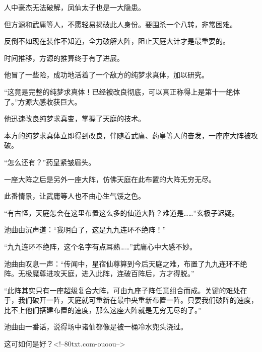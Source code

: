 \begin{this_body}
人中豪杰无法破解，凤仙太子也是一大隐患。

但方源和武庸等人，不愿轻易揭破此人身份。要围杀一个八转，非常困难。

反倒不如现在装作不知道，全力破解大阵，阻止天庭大计才是最重要的。

时间推移，方源的推算终于有了进展。

他冒了一些险，成功地活着了一个敌方的纯梦求真体，加以研究。

“这竟是完整的纯梦求真体！已经被改良彻底，可以真正称得上是第十一绝体了。”方源大感收获巨大。

他迅速改良纯梦求真变，掌握了天庭的技术。

本方的纯梦求真体立即得到改良，伴随着武庸、药皇等人的奋发，一座座大阵被攻破。

“怎么还有？”药皇紧皱眉头。

一座大阵之后是另外一座大阵，仿佛天庭在此布置的大阵无穷无尽。

此番情景，让武庸等人也不由心生气馁之色。

“有古怪，天庭怎会在这里布置这么多的仙道大阵？难道是……”玄极子迟疑。

池曲由沉声道：“我明白了，这是九九连环不绝阵！”

“九九连环不绝阵，这个名字有点耳熟……”武庸心中大感不妙。

池曲由叹息一声：“传闻中，星宿仙尊算到今后天庭之难，布置了九九连环不绝阵。无极魔尊进攻天庭，进入此阵，连破百阵后，方才得脱。”

“此阵其实只有一座超级复合大阵，可由九座子阵任意组合而成。关键的难处在于，我们破开一阵，天庭就可重新在最中央重新布置一阵。只要我们破阵的速度，比不上他们搭建布置的速度，那么这座大阵就是无穷无尽的了。”

池曲由一番话，说得场中诸仙都像是被一桶冷水兜头浇过。

这可如何是好？<!--80txt.com-ouoou-->

\end{this_body}

